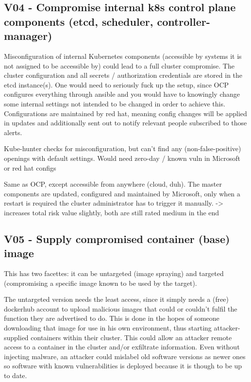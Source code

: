 \subsection{V04 - Compromise internal k8s control plane components (etcd, scheduler, controller-manager)}
Misconfiguration of internal Kubernetes components (accessible by systems it is not assigned to be accessible by) could lead to a full cluster compromise. The cluster configuration and all secrets / authorization credentials are stored in the etcd instance(s). One would need to seriously fuck up the setup, since OCP configures everything through ansible and you would have to knowingly change some internal settings not intended to be changed in order to achieve this. Configurations are maintained by red hat, meaning config changes will be applied in updates and additionally sent out to notify relevant people subscribed to those alerts.

Kube-hunter checks for misconfiguration, but can’t find any (non-false-positive) openings with default settings. Would need zero-day / known vuln in Microsoft or red hat configs

Same as OCP, except accessible from anywhere (cloud, duh).
The master components are updated, configured and maintained by Microsoft, only when a restart is required the cluster administrator has to trigger it manually.
-> increases total risk value slightly, both are still rated medium in the end

\subsection{V05 - Supply compromised container (base) image}
This has two facettes: it can be untargeted (image spraying) and targeted (compromising a specific image known to be used by the target).

The untargeted version needs the least access, since it simply needs a (free) dockerhub account to upload malicious images that could or couldn’t fulfil the function they are advertised to do. This is done in the hopes of someone downloading that image for use in his own environment, thus starting attacker-supplied containers within their cluster.
This could allow an attacker remote access to a container in the cluster and/or exfiltrate information.
Even without injecting malware, an attacker could mislabel old software versions as newer ones so software with known vulnerabilities is deployed because it is though to be up to date.

